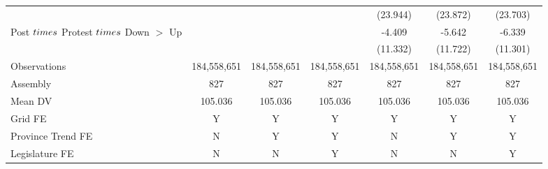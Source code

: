 {\begin{tabular}{l*{6}{c}}
            &                     &                     &                     &    (23.944)         &    (23.872)         &    (23.703)         \\
Post $\\times$ Protest $\\times$ Down $>$ Up&                     &                     &                     &      -4.409         &      -5.642         &      -6.339         \\
            &                     &                     &                     &    (11.332)         &    (11.722)         &    (11.301)         \\
\hline
Observations& 184,558,651         & 184,558,651         & 184,558,651         & 184,558,651         & 184,558,651         & 184,558,651         \\
Assembly    &         827         &         827         &         827         &         827         &         827         &         827         \\
Mean DV     &     105.036         &     105.036         &     105.036         &     105.036         &     105.036         &     105.036         \\
Grid FE     &           Y         &           Y         &           Y         &           Y         &           Y         &           Y         \\
Province Trend FE&           N         &           Y         &           Y         &           N         &           Y         &           Y         \\
Legislature FE&           N         &           N         &           Y         &           N         &           N         &           Y         \\
\hline
\end{tabular}
}
